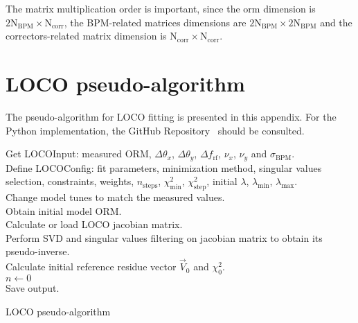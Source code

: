 The matrix multiplication order is important, since the \gls{orm} dimension is $2\mathrm{N}_{\mathrm{BPM}} \times \mathrm{N}_{\mathrm{corr}}$, the BPM-related matrices dimensions are $2\mathrm{N}_{\mathrm{BPM}} \times 2\mathrm{N}_{\mathrm{BPM}}$ and the correctors-related matrix dimension is $\mathrm{N}_{\mathrm{corr}} \times \mathrm{N}_{\mathrm{corr}}$. 

\chapter{LOCO pseudo-algorithm}\label{appendix:algo}
The pseudo-algorithm for LOCO fitting is presented in this appendix. For the Python implementation, the GitHub Repository~\cite{locosirius} should be consulted.

\begin{algorithm}[h!]
\SetAlgoLined
{}
 Get LOCOInput: measured ORM, $\Delta \theta_x$, $\Delta \theta_y$, $\Delta f_{\mathrm{rf}}$, $\nu_x$, $\nu_y$ and $\sigma_{\mathrm{BPM}}$.\\
 Define LOCOConfig: fit parameters, minimization method, singular values selection, constraints, weights, $n_{\mathrm{steps}}$, $\chi^2_{\mathrm{min}}$, $\chi^2_{\mathrm{step}}$, initial $\lambda$, $\lambda_{\mathrm{min}}$, $\lambda_{\mathrm{max}}$.\\
 Change model tunes to match the measured values.\\
 Obtain initial model ORM.\\
 Calculate or load LOCO jacobian matrix.\\
 Perform SVD and singular values filtering on jacobian matrix to obtain its pseudo-inverse.\\
 Calculate initial reference residue vector $\vec{V}_0$ and $\chi^2_0$.\\
 $n \leftarrow 0$ \\
 Save output.
 \caption{LOCO pseudo-algorithm}
 \label{algo:loco}
\end{algorithm}

